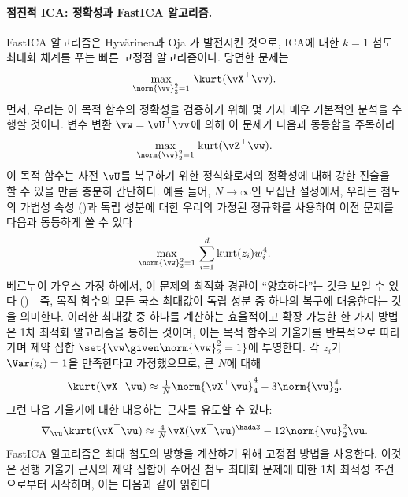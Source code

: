 \documentclass[../../book-main_ko.tex]{subfiles}
\begin{document}
\paragraph{점진적 ICA: 정확성과 FastICA 알고리즘.}
FastICA 알고리즘은 Hyv\"{a}rinen과 Oja \cite{hyvarinen-1997}가 발전시킨 것으로, ICA에 대한 \(k=1\) 첨도 최대화 체계를 푸는 빠른 고정점 알고리즘이다.
당면한 문제는
\begin{equation}\label{eq:kurtosis-maximization-sphere-finitesample}
    \max_{\norm{\vv}_2^2 = 1}\, \kurt(\vX^\top \vv).
\end{equation}
먼저, 우리는 이 목적 함수의 정확성을 검증하기 위해 몇 가지 매우 기본적인 분석을 수행할 것이다. 변수 변환 \(\vw = \vU^\top \vv\)에 의해 이 문제가 다음과 동등함을 주목하라
\begin{equation*}
    \max_{\norm{\vw}_2^2 = 1}\,
    \mathrm{kurt}(\vZ^\top \vw).
\end{equation*}
이 목적 함수는 사전 \(\vU\)를 복구하기 위한 정식화로서의 정확성에 대해 강한 진술을 할 수 있을 만큼 충분히 간단하다.
예를 들어, \(N \to \infty\)인 모집단 설정에서,
우리는 첨도의 가법성 속성 ()과 독립 성분에 대한 우리의 가정된 정규화를 사용하여 이전 문제를 다음과 동등하게 쓸 수 있다
\begin{equation}\label{eq:kurtosis-maximization-sphere-population-simple}
    \max_{\norm{\vw}_2^2 = 1}\,
    \sum_{i=1}^d \mathrm{kurt}(z_i) w_i^4.
\end{equation}
베르누이-가우스 가정 하에서, 이 문제의 최적화 경관이 ``양호하다''는 것을 보일 수 있다 ()---즉, 목적 함수의 모든 국소 최대값이 독립 성분 중 하나의 복구에 대응한다는 것을 의미한다.
이러한 최대값 중 하나를 계산하는 효율적이고 확장 가능한 한 가지 방법은 1차 최적화 알고리즘을 통하는 것이며, 이는 목적 함수의 기울기를 반복적으로 따라가며 제약 집합 \(\set{\vw \given \norm{\vw}_2^2 = 1}\)에 투영한다.
각 \(z_i\)가 \(\Var(z_i)=1\)을 만족한다고 가정했으므로, 큰 \(N\)에 대해
\begin{equation}\label{eq:kurtosis-approximation-l4}
    \kurt(\vX^\top \vu)
    \approx
    \tfrac{1}{N} \norm{\vX^\top \vu}_4^4 - 3 \norm{\vu}_2^4.
\end{equation}
그런 다음 기울기에 대한 대응하는 근사를 유도할 수 있다:
\begin{equation*}
    \nabla_{\vu} \kurt(\vX^\top \vu)
    \approx
    \tfrac{4}{N} \vX (\vX^\top \vu)^{\hada 3}
    - 12 \norm{\vu}_2^2 \vu.
\end{equation*}
FastICA 알고리즘은 최대 첨도의 방향을 계산하기 위해 고정점 방법을 사용한다. 이것은 선행 기울기 근사와 제약 집합이 주어진 첨도 최대화 문제에 대한 1차 최적성 조건으로부터 시작하며, 이는 다음과 같이 읽힌다
\end{document}
